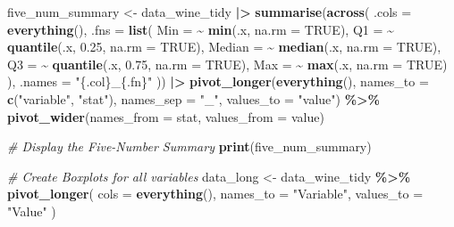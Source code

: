 \documentclass[
  doc,floatsintext]{apa6}
\newenvironment{Shaded}{\begin{snugshade}}{\end{snugshade}}
\newcommand{\AttributeTok}[1]{\textcolor[rgb]{0.13,0.29,0.53}{#1}}
\newcommand{\CommentTok}[1]{\textcolor[rgb]{0.56,0.35,0.01}{\textit{#1}}}
\newcommand{\ConstantTok}[1]{\textcolor[rgb]{0.56,0.35,0.01}{#1}}
\newcommand{\FloatTok}[1]{\textcolor[rgb]{0.00,0.00,0.81}{#1}}
\newcommand{\FunctionTok}[1]{\textcolor[rgb]{0.13,0.29,0.53}{\textbf{#1}}}
\newcommand{\NormalTok}[1]{#1}
\newcommand{\OtherTok}[1]{\textcolor[rgb]{0.56,0.35,0.01}{#1}}
\newcommand{\SpecialCharTok}[1]{\textcolor[rgb]{0.81,0.36,0.00}{\textbf{#1}}}
\newcommand{\StringTok}[1]{\textcolor[rgb]{0.31,0.60,0.02}{#1}}
\begin{document}
\begin{Shaded}
\begin{Highlighting}[]
\NormalTok{five\_num\_summary }\OtherTok{\textless{}{-}}\NormalTok{ data\_wine\_tidy }\SpecialCharTok{|\textgreater{}}
  \FunctionTok{summarise}\NormalTok{(}\FunctionTok{across}\NormalTok{(}
    \AttributeTok{.cols =} \FunctionTok{everything}\NormalTok{(),}
    \AttributeTok{.fns =} \FunctionTok{list}\NormalTok{(}
      \AttributeTok{Min  =} \SpecialCharTok{\textasciitilde{}} \FunctionTok{min}\NormalTok{(.x, }\AttributeTok{na.rm =} \ConstantTok{TRUE}\NormalTok{),}
      \AttributeTok{Q1   =} \SpecialCharTok{\textasciitilde{}} \FunctionTok{quantile}\NormalTok{(.x, }\FloatTok{0.25}\NormalTok{, }\AttributeTok{na.rm =} \ConstantTok{TRUE}\NormalTok{),}
      \AttributeTok{Median =} \SpecialCharTok{\textasciitilde{}} \FunctionTok{median}\NormalTok{(.x, }\AttributeTok{na.rm =} \ConstantTok{TRUE}\NormalTok{),}
      \AttributeTok{Q3   =} \SpecialCharTok{\textasciitilde{}} \FunctionTok{quantile}\NormalTok{(.x, }\FloatTok{0.75}\NormalTok{, }\AttributeTok{na.rm =} \ConstantTok{TRUE}\NormalTok{),}
      \AttributeTok{Max  =} \SpecialCharTok{\textasciitilde{}} \FunctionTok{max}\NormalTok{(.x, }\AttributeTok{na.rm =} \ConstantTok{TRUE}\NormalTok{)}
\NormalTok{    ),}
    \AttributeTok{.names =} \StringTok{"\{.col\}\_\{.fn\}"}
\NormalTok{  )) }\SpecialCharTok{|\textgreater{}}
  \FunctionTok{pivot\_longer}\NormalTok{(}\FunctionTok{everything}\NormalTok{(),}
               \AttributeTok{names\_to =} \FunctionTok{c}\NormalTok{(}\StringTok{"variable"}\NormalTok{, }\StringTok{"stat"}\NormalTok{),}
               \AttributeTok{names\_sep =} \StringTok{"\_"}\NormalTok{,}
               \AttributeTok{values\_to =} \StringTok{"value"}\NormalTok{) }\SpecialCharTok{\%\textgreater{}\%}
  \FunctionTok{pivot\_wider}\NormalTok{(}\AttributeTok{names\_from =}\NormalTok{ stat, }\AttributeTok{values\_from =}\NormalTok{ value)}

\CommentTok{\# Display the Five{-}Number Summary}
\FunctionTok{print}\NormalTok{(five\_num\_summary)}

\CommentTok{\# Create Boxplots for all variables}
\NormalTok{data\_long }\OtherTok{\textless{}{-}}\NormalTok{ data\_wine\_tidy }\SpecialCharTok{\%\textgreater{}\%}
  \FunctionTok{pivot\_longer}\NormalTok{(}
    \AttributeTok{cols =} \FunctionTok{everything}\NormalTok{(),}
    \AttributeTok{names\_to =} \StringTok{"Variable"}\NormalTok{,}
    \AttributeTok{values\_to =} \StringTok{"Value"}
\NormalTok{  )}


\end{Highlighting}
\end{Shaded}
\end{document}
